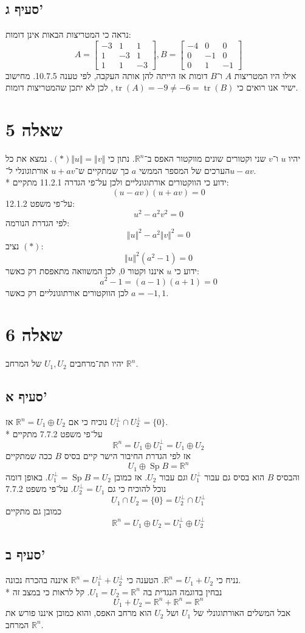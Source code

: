 \documentclass[a4paper,10pt]{article}
\DeclareMathOperator\Sp{Sp}
\DeclareMathOperator\tr{tr}
\def\RR{\mathbb{R}}
\begin{document}
\subsection{סעיף ג'}
נראה כי המטריצות הבאות אינן דומות:
\[
	A =
	\begin{bmatrix}
		-3 & 1 & 1 \\
		1 & -3 & 1 \\
		1 & 1 & -3
	\end{bmatrix},
	B = 
	\begin{bmatrix}
		-4 & 0 & 0 \\
		0 & -1 & 0 \\
		0 & 1 & -1
	\end{bmatrix}
\]
אילו היו המטריצות $A$ ו־$B$ דומות אז הייתה להן אותה העקבה, לפי טענה 10.7.5.
מחישוב ישיר אנו רואים כי $\tr(A) = -9 \ne -6 = \tr(B)$,
לכן לא יתכן שהמטריצות דומות.

\section{שאלה 5}
יהיו $u$ ו־$v$ שני וקטורים שונים מווקטור האפס ב־$\RR^n$.
נתון כי $(*) \Vert u \Vert = \Vert v \Vert$.
נמצא את כל הערכים של המספר הממשי $a$ כך שמתקיים
ש־$u + av$ אורתוגונלי ל־$u - av$. \\*
ידוע כי הווקטורים אורתוגונליים ולכן על־פי הגדרה 11.2.1 מתקיים:
\[
	(u - av)(u + av) = 0
\]
על־פי משפט 12.1.2:
\[
	u^2 - a^2 v^2 = 0
\]
לפי הגדרת הנורמה:
\[
	{\Vert u \Vert}^2
	-
	a^2 {\Vert v \Vert}^2
	= 0
\]
נציב $(*)$:
\[
	{\Vert u \Vert}^2 (a^2 - 1) = 0
\]
ידוע כי $u$ איננו וקטור $0$, לכן המשוואה מתאפסת רק כאשר:
\[
	a^2 - 1 = (a - 1)(a + 1) = 0
\]
לכן הווקטורים אורתוגונליים רק כאשר $a = -1, 1$.

\section{שאלה 6}
יהיו תת־מרחבים $U_1, U_2$ של המרחב $\mathbb{R}^n$.

\subsection{סעיף א'}
נוכיח כי אם $\mathbb{R}^n = U_1 \oplus U_2$ אז $U_1^\perp \cap U_2^\perp = \{ 0 \}$. \\*
על־פי משפט 7.7.2 מתקיים
\[
	\RR^n = U_1 \oplus U_1^\perp = U_1 \oplus U_2
\]
אז לפי הגדרת החיבור הישר קיים בסיס $B$ ככה שמתקיים
\[
	U_1 \oplus \Sp B = \RR^n
\]
והבסיס $B$ הוא בסיס גם עבור $U_1^\perp$ וגם עבור $U_2$.
אז כמובן $U_1^\perp = \Sp B = U_2$. באופן דומה נוכל להוכיח כי גם $U_2^\perp = U_1$.
על־פי משפט 7.7.2
\[
	U_1 \cap U_2 = \{0\} = U_2^\perp \cap U_1^\perp
\]
כמובן גם מתקיים
\[
	\RR^n = U_1 \oplus U_2 = U_1^\perp \oplus U_2^\perp
\]

\subsection{סעיף ב'}
נניח כי $\mathbb{R}^n = U_1 + U_2$.
הטענה כי $\mathbb{R}^n = U_1^\perp + U_2^\perp$ איננה בהכרח נכונה. \\*
נבחין בדוגמה הנגדית בה $U_1 = U_2 = \mathbb{R}^n$.
קל לראות כי במצב זה
\[
	U_1 + U_2 = \mathbb{R}^n + \mathbb{R}^n = \mathbb{R}^n 
\]
אבל המשלים האורתוגונלי של $U_1$ ושל $U_2$ הוא מרחב האפס,
והוא כמובן איננו פורש את המרחב $\mathbb{R}^n$.
\end{document}
